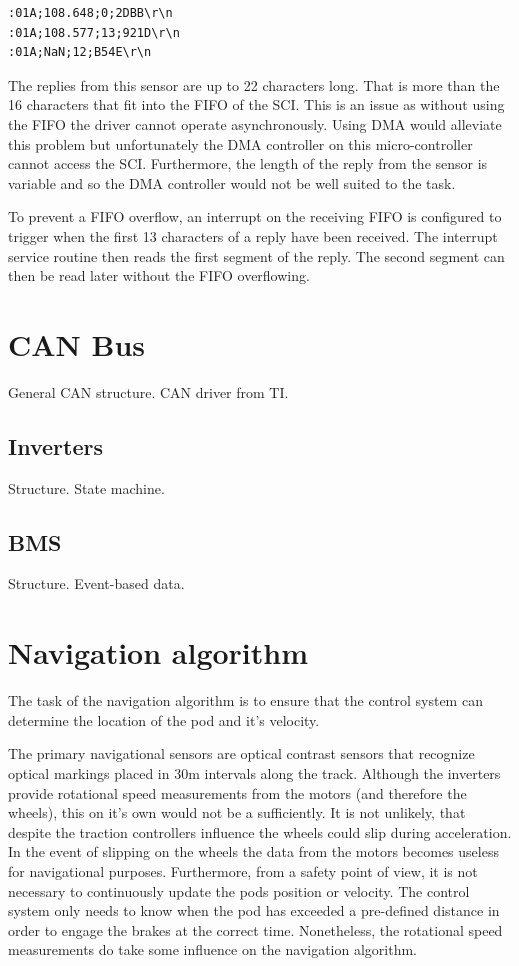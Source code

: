 \begin{verbatim}
:01A;108.648;0;2DBB\r\n
:01A;108.577;13;921D\r\n
:01A;NaN;12;B54E\r\n
\end{verbatim}

The replies from this sensor are up to 22 characters long. That is more than the 16 characters that fit into the FIFO of the SCI. This is an issue as without using the FIFO the driver cannot operate asynchronously. Using DMA would alleviate this problem but unfortunately the DMA controller on this micro-controller cannot access the SCI. Furthermore, the length of the reply from the sensor is variable and so the DMA controller would not be well suited to the task.

To prevent a FIFO overflow, an interrupt on the receiving FIFO is configured to trigger when the first 13 characters of a reply have been received. The interrupt service routine then reads the first segment of the reply. The second segment can then be read later without the FIFO overflowing.

\section{CAN Bus}

General CAN structure. CAN driver from TI.

\subsection{Inverters}

Structure. State machine.

\subsection{BMS}

Structure. Event-based data.

\section{Navigation algorithm}

The task of the navigation algorithm is to ensure that the control system can determine the location of the pod and it's velocity.

The primary navigational sensors are optical contrast sensors that recognize optical markings placed in 30m intervals along the track. Although the inverters provide rotational speed measurements from the motors (and therefore the wheels), this on it's own would not be a sufficiently. It is not unlikely, that despite the traction controllers influence the wheels could slip during acceleration. In the event of slipping on the wheels the data from the motors becomes useless for navigational purposes. Furthermore, from a safety point of view, it is not necessary to continuously update the pods position or velocity. The control system only needs to know when the pod has exceeded a pre-defined distance in order to engage the brakes at the correct time. Nonetheless, the rotational speed measurements do take some influence on the navigation algorithm.

